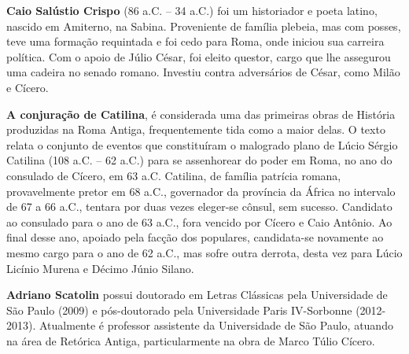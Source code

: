 \textbf{Caio Salústio Crispo} (86 a.C. -- 34 a.C.) foi um historiador e poeta latino, nascido em Amiterno, na Sabina. Proveniente de família plebeia, mas com posses, teve uma formação requintada e foi cedo para Roma, onde iniciou sua carreira política. Com o apoio de Júlio César, foi eleito questor, cargo que lhe assegurou uma cadeira no senado romano. Investiu contra adversários de César, como Milão e Cícero. 


\textbf{A conjuração de Catilina}, é considerada uma das primeiras obras de História produzidas na Roma Antiga, frequentemente tida como a maior delas. O texto relata o conjunto de eventos que constituíram o malogrado plano de Lúcio Sérgio Catilina (108 a.C. -- 62 a.C.) para se assenhorear do poder em Roma, no ano do consulado de Cícero, em 63 a.C. Catilina, de família patrícia romana, provavelmente pretor em 68 a.C., governador da província da África no intervalo de 67 a 66 a.C., tentara por duas vezes eleger-se cônsul, sem sucesso. Candidato ao consulado para o ano de 63 a.C., fora vencido por Cícero e Caio Antônio. Ao final desse ano, apoiado pela facção dos populares, candidata-se novamente ao mesmo cargo para o ano de 62 a.C., mas sofre outra derrota, desta vez para Lúcio Licínio Murena e Décimo Júnio Silano.


\textbf{Adriano Scatolin} possui doutorado em Letras Clássicas pela Universidade de São Paulo (2009) e pós-doutorado pela Universidade Paris IV-Sorbonne (2012-2013). Atualmente é professor assistente da Universidade de São Paulo, atuando na área de Retórica Antiga, particularmente na obra de Marco Túlio Cícero.\par
